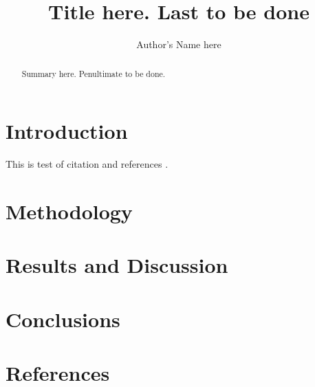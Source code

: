 \documentclass[a4paper, 12pt]{article}
\title{Title here. Last to be done}
\author{Author's Name here}
\date{}
\begin{document}
\maketitle

\begin{abstract}
    Summary here. Penultimate to be done.
\end{abstract}

\section{Introduction}
This is test of citation and references \cite{test}.

\section{Methodology}

\section{Results and Discussion}

\section{Conclusions}

\section{References}
\begin{refsection}
\nocite{*}
\printbibliography[heading=none]
\end{refsection}
\end{document}
